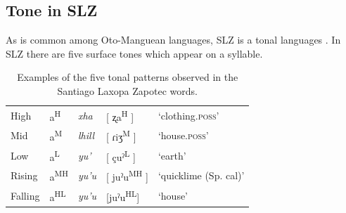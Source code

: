 \documentclass[12pt, letterpaper]{article}
\newcommand{\supr}[1]{\textsuperscript{#1}}
\providecommand{\lsptoprule}{\midrule\toprule}
\providecommand{\lspbottomrule}{\bottomrule\midrule}
\begin{document}
\subsection{Tone in SLZ} \label{sec:Tone}

As is common among Oto-Manguean languages, SLZ is a tonal languages \citep{suarezMesoamericanIndianLanguages1983,campbellMesoAmericaLinguisticArea1986,silvermanLaryngealComplexityOtomanguean1997,campbellOtomangueanHistoricalLinguistics2017a,campbellOtomangueanHistoricalLinguistics2017}. In SLZ there are five surface tones which appear on a syllable. 



\begin{table}[!h]
	\centering
	\caption{Examples of the five tonal patterns observed in the Santiago Laxopa Zapotec words.}
	\label{tab:tones}
	 \begin{tabular}{lllll}
	  \lsptoprule
	  High   	&  a\supr{H}  &  \textit{xha}   &  [ ʐa\supr{H} ] & `clothing.\textsc{poss}'\\
		Mid    	&  a\supr{M}  &  \textit{lhill} 	& [ ɾiʒ\supr{M} ] & `house.\textsc{poss}' \\
		Low   	&  a\supr{L}  &  \textit{yu'} 	&	 [ çuˀ\supr{L} ] & `earth'\\
		Rising	&  a\supr{MH}  &  \textit{yu'u} 	&	[ juˀu\supr{MH} ] & `quicklime (Sp. cal)' \\
		Falling &  a\supr{HL}  &  \textit{yu'u}  &	[juˀu\supr{HL}] &	`house' \\
	  \lspbottomrule
	 \end{tabular}
\end{table}
\end{document}
